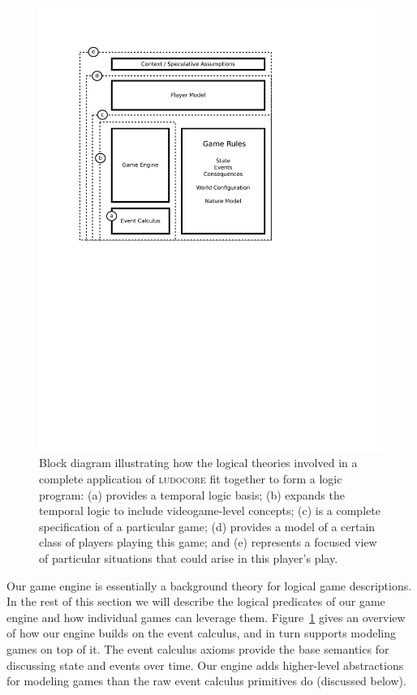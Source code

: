 \documentclass[conference]{IEEEtran}
\newcommand{\ludocore}{\textsc{ludocore}}
\begin{document}
\begin{figure}
\includegraphics[width=\columnwidth,trim=1in 5.2in 2.7in 1in,clip=true]{ludocore_anatomy.pdf}
\caption{Block diagram illustrating how the logical theories involved in a
complete application of \ludocore{} fit together to form a logic program:
(a) provides a temporal logic basis; (b) expands the temporal logic to include
videogame-level concepts; (c) is a complete specification of a particular game;
(d) provides a model of a certain class of players playing this game; and (e)
represents a focused view of particular situations that could arise in this
player's play.
}
\label{fig:anatomy}
\end{figure}

Our game engine is essentially a background theory for logical game
descriptions. In the rest of this section we will describe the logical
predicates of our game engine and how individual games can leverage them.
Figure~\ref{fig:anatomy} gives an overview of how our engine builds on the
event calculus, and in turn supports modeling games on top of it.
The event calculus axioms provide the base semantics for discussing state
and events over time. Our engine adds higher-level abstractions for modeling
games than the raw event calculus primitives do (discussed below).
\end{document}
